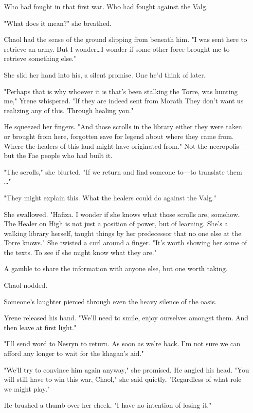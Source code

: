 Who had fought in that first war.
Who had fought against the Valg.

"What does it mean?"
she breathed.

Chaol had the sense of the ground slipping from beneath him.
"I was sent here to retrieve an army.
But I wonder\ldots I wonder if some other force brought me to retrieve something else."

She slid her hand into his, a silent promise.
One he'd think of later.

"Perhaps that is why whoever it is that's been stalking the Torre, was hunting me," Yrene whispered.
"If they are indeed sent from Morath  They don't want us realizing any of this.
Through healing you."

He squeezed her fingers.
"And those scrolls in the library 
either they were taken or brought from here, forgotten save for legend about where they came from.
Where the healers of this land might have originated from."
Not the necropolis---but the Fae people who had built it.

"The scrolls," she blurted.
"If we return and find someone to---to translate them \ldots"

"They might explain this.
What the healers could do against the Valg."

She swallowed.
"Hafiza.
I wonder if she knows what those scrolls are, somehow.
The Healer on High is not just a position of power, but of learning.
She's a walking library herself, taught things by her predecessor that no one else at the Torre knows."
She twisted a curl around a finger.
"It's worth showing her some of the texts.
To see if she might know what they are."

A gamble to share the information with anyone else, but one worth taking.

Chaol nodded.

Someone's laughter pierced through even the heavy silence of the oasis.

Yrene released his hand.
"We'll need to smile, enjoy ourselves amongst them.
And then leave at first light."

"I'll send word to Nesryn to return.
As soon as we're back.
I'm not sure we can afford any longer to wait for the khagan's aid."

"We'll try to convince him again anyway," she promised.
He angled his head.
"You will still have to win this war, Chaol," she said quietly.
"Regardless of what role we might play."

He brushed a thumb over her cheek.
"I have no intention of losing it."

